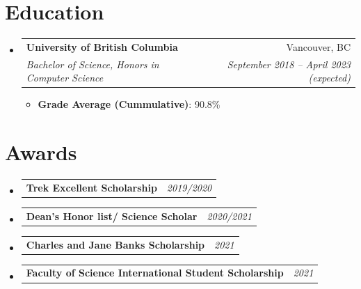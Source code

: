 \documentclass[letterpaper,11pt]{article}
\makeatletter
\newcommand{\resumeItem}[2]{
  \item{
    \textbf{#1}{: #2 \vspace{-2pt}}
  }
}
\newcommand{\resumeSubheading}[4]{
  \vspace{-1pt}\item
    \begin{tabular*}{0.97\textwidth}{@{}l@{\extracolsep{\fill}}r@{}}
      \textbf{#1} & #2 \\
      \textit{#3} & \textit{ #4} \\
    \end{tabular*}\vspace{-5pt}
}
\newcommand{\awardSubItem}[2]{
  \item
    \begin{tabular*}{0.97\textwidth}{@{}l@{\extracolsep{\fill}}r@{}}
      \textbf{ #1} & \textit{ #2} \\
    \end{tabular*}\vspace{-8pt}
}
\newcommand{\resumeSubItem}[2]{\resumeItem{#1}{#2}\vspace{-4pt}}
\newcommand{\resumeSubHeadingListStart}{\begin{itemize}[leftmargin=*]}
\newcommand{\resumeSubHeadingListEnd}{\end{itemize}}
\newcommand{\resumeItemListStart}{\begin{itemize}}
\newcommand{\resumeItemListEnd}{\end{itemize}\vspace{-5pt}}
\makeatother
\begin{document}
  


%



\section{Education}
  \resumeSubHeadingListStart
    \resumeSubheading
      {University of British Columbia}{Vancouver, BC}
      {Bachelor of Science, Honors in Computer Science}{September 2018 -- April 2023 (expected)}
      \resumeItemListStart
          \resumeItem{Grade Average (Cummulative)} {90.8\%}
      \resumeItemListEnd
  \resumeSubHeadingListEnd



\section{Awards}
  \resumeSubHeadingListStart
  \awardSubItem{Trek Excellent Scholarship}     {2019/2020}
  \awardSubItem{Dean's Honor list/ Science Scholar} {2020/2021}
  \awardSubItem{Charles and Jane Banks Scholarship}{2021}
  \awardSubItem{Faculty of Science International Student Scholarship}{2021}
  \resumeSubHeadingListEnd
\end{document}

